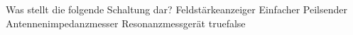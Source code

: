     {Was stellt die folgende Schaltung dar? }
    {Feldstärkeanzeiger}
    {Einfacher Peilsender}
    {Antennenimpedanzmesser}
    {Resonanzmessgerät}
    {true}{false}